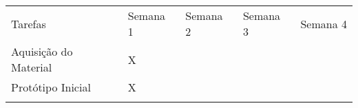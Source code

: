 \begin{longtable}[c]{@{}lllll@{}}
\toprule\addlinespace
\begin{minipage}[b]{0.39\columnwidth}\raggedright
Tarefas
\end{minipage} & \begin{minipage}[b]{0.12\columnwidth}\raggedright
Semana 1
\end{minipage} & \begin{minipage}[b]{0.12\columnwidth}\raggedright
Semana 2
\end{minipage} & \begin{minipage}[b]{0.12\columnwidth}\raggedright
Semana 3
\end{minipage} & \begin{minipage}[b]{0.12\columnwidth}\raggedright
Semana 4
\end{minipage}
\\\addlinespace
\midrule\endhead
\begin{minipage}[t]{0.39\columnwidth}\raggedright
Aquisição do Material
\end{minipage} & \begin{minipage}[t]{0.12\columnwidth}\raggedright
X
\end{minipage} & \begin{minipage}[t]{0.12\columnwidth}\raggedright
\end{minipage} & \begin{minipage}[t]{0.12\columnwidth}\raggedright
\end{minipage} & \begin{minipage}[t]{0.12\columnwidth}\raggedright
\end{minipage}
\\\addlinespace
\begin{minipage}[t]{0.39\columnwidth}\raggedright
Protótipo Inicial
\end{minipage} & \begin{minipage}[t]{0.12\columnwidth}\raggedright
X
\end{minipage} & \begin{minipage}[t]{0.12\columnwidth}\raggedright
\end{minipage} & \begin{minipage}[t]{0.12\columnwidth}\raggedright
\end{minipage} & \begin{minipage}[t]{0.12\columnwidth}\raggedright
\end{minipage}
\\\addlinespace
\begin{minipage}[t]{0.39\columnwidth}\raggedright

\end{minipage}
\end{longtable}
